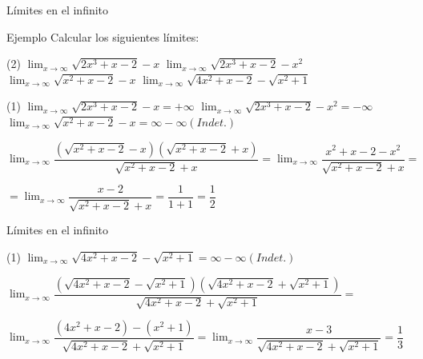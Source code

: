 \documentclass[8pt]{beamer}
\newcommand{\limite}[2]{\displaystyle \lim_{x \rightarrow #1}{#2}}
\begin{document}
\begin{frame}{Límites en el infinito}
\begin{exampleblock}{Ejemplo}
Calcular los siguientes límites:
\begin{tasks}[label=\alph*)](2)
\task $\limite{\infty}{\sqrt{2x^3+x-2}-x}$
\task $\limite{\infty}{\sqrt{2x^3+x-2}-x^2}$
\task $\limite{\infty}{\sqrt{x^2+x-2}-x}$
\task $\limite{\infty}{\sqrt{4x^2+x-2}-\sqrt{x^2+1}}$
\end{tasks}
\end{exampleblock}

\begin{tasks}[label=\alph*)](1)
\task $\limite{\infty}{\sqrt{2x^3+x-2}-x} = +\infty$
\task $\limite{\infty}{\sqrt{2x^3+x-2}-x^2}= - \infty$
\task $\limite{\infty}{\sqrt{x^2+x-2}-x}= \infty - \infty (Indet.)$

\vspace{10pt}
$\limite{\infty}{\dfrac{(\sqrt{x^2+x-2}-x)(\sqrt{x^2+x-2}+x)}{\sqrt{x^2+x-2}+x}}= 
\limite{\infty}{\dfrac{x^2+x-2-x^2}{\sqrt{x^2+x-2}+x}}= $

\vspace{10pt}
$=\limite{\infty}{\dfrac{x-2}{\sqrt{x^2+x-2}+x}}=\dfrac{1}{1+1}=\dfrac{1}{2}$

\end{tasks}

\end{frame}

\begin{frame}{Límites en el infinito}
\begin{tasks}[label=\alph*),resume](1)
\task $\limite{\infty}{\sqrt{4x^2+x-2}-\sqrt{x^2+1}}=\infty - \infty (Indet.)$

\vspace{10pt}
 $\limite{\infty}{\dfrac{(\sqrt{4x^2+x-2}-\sqrt{x^2+1})(\sqrt{4x^2+x-2}+\sqrt{x^2+1})}{\sqrt{4x^2+x-2}+\sqrt{x^2+1}}}=$
 
 \vspace{10pt}
$\limite{\infty}{\dfrac{(4x^2+x-2)-(x^2+1)}{\sqrt{4x^2+x-2}+\sqrt{x^2+1}}}= \limite{\infty}{\dfrac{x-3}{\sqrt{4x^2+x-2}+\sqrt{x^2+1}}}= \dfrac{1}{3}$
\end{tasks}
\end{frame}
\end{document}
